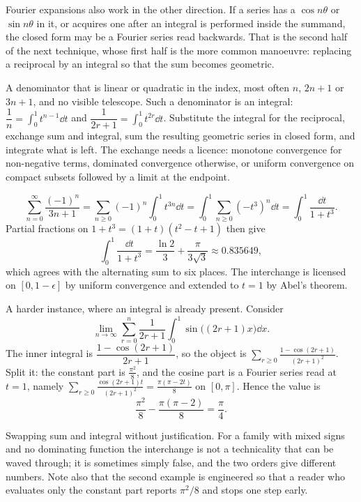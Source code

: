 Fourier expansions also work in the other direction. If a series has a $\cos n\theta$ or $\sin n\theta$ in it, or acquires one after an integral is performed inside the summand, the closed form may be a Fourier series read backwards. That is the second half of the next technique, whose first half is the more common manoeuvre: replacing a reciprocal by an integral so that the sum becomes geometric.

\cue A denominator that is linear or quadratic in the index, most often $n$, $2n+1$ or $3n+1$, and no visible telescope. Such a denominator is an integral: $\dfrac1n=\displaystyle\int_0^1t^{n-1}\dd t$ and $\dfrac{1}{2r+1}=\displaystyle\int_0^1t^{2r}\dd t$.
\method Substitute the integral for the reciprocal, exchange sum and integral, sum the resulting geometric series in closed form, and integrate what is left. The exchange needs a licence: monotone convergence for non-negative terms, dominated convergence otherwise, or uniform convergence on compact subsets followed by a limit at the endpoint.

\begin{worked}
\[\sum_{n=0}^{\infty}\frac{(-1)^{n}}{3n+1}=\sum_{n\geq0}(-1)^{n}\int_0^1 t^{3n}\dd t=\int_0^1\sum_{n\geq0}(-t^{3})^{n}\dd t=\int_0^1\frac{\dd t}{1+t^{3}}.\]
Partial fractions on $1+t^{3}=(1+t)(t^{2}-t+1)$ then give
\[\int_0^1\frac{\dd t}{1+t^{3}}=\frac{\ln2}{3}+\frac{\pi}{3\sqrt3}\approx0.835649,\]
which agrees with the alternating sum to six places. The interchange is licensed on $[0,1-\epsilon]$ by uniform convergence and extended to $t=1$ by Abel's theorem.

A harder instance, where an integral is already present. Consider
\[\lim_{n\to\infty}\sum_{r=0}^{n}\frac{1}{2r+1}\int_{0}^{1}\sin\bigl((2r+1)x\bigr)\dd x.\]
The inner integral is $\dfrac{1-\cos(2r+1)}{2r+1}$, so the object is $\displaystyle\sum_{r\geq0}\frac{1-\cos(2r+1)}{(2r+1)^{2}}$. Split it: the constant part is $\tfrac{\pi^{2}}{8}$, and the cosine part is a Fourier series read at $t=1$, namely $\sum_{r\geq0}\tfrac{\cos(2r+1)t}{(2r+1)^{2}}=\tfrac{\pi(\pi-2t)}{8}$ on $[0,\pi]$. Hence the value is
\[\frac{\pi^{2}}{8}-\frac{\pi(\pi-2)}{8}=\frac{\pi}{4}.\]
\end{worked}

\begin{trap}
Swapping sum and integral without justification. For a family with mixed signs and no dominating function the interchange is not a technicality that can be waved through; it is sometimes simply false, and the two orders give different numbers. Note also that the second example is engineered so that a reader who evaluates only the constant part reports $\pi^{2}/8$ and stops one step early.
\end{trap}

